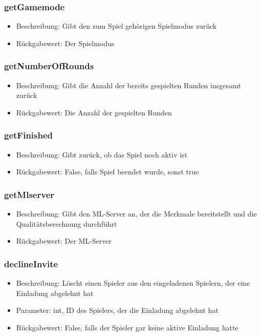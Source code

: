 \documentclass[a4paper]{scrreprt}
\begin{document}
	\subsubsection{getGamemode}
	\begin{itemize}
		\item Beschreibung: Gibt den zum Spiel gehörigen Spielmodus zurück
		\item Rückgabewert: Der Spielmodus
	\end{itemize}
	\subsubsection{getNumberOfRounds}
	\begin{itemize}
		\item Beschreibung: Gibt die Anzahl der bereits gespielten Runden insgesamt zurück
		\item Rückgabewert: Die Anzahl der gespielten Runden
	\end{itemize}     
	\subsubsection{getFinished}
	\begin{itemize}
		\item Beschreibung: Gibt zurück, ob das Spiel noch aktiv ist
		\item Rückgabewert: False, falls Spiel beendet wurde, sonst true
	\end{itemize}
	\subsubsection{getMlserver}
	\begin{itemize}
		\item Beschreibung: Gibt den ML-Server an, der die Merkmale bereitstellt und die Qualitätsberechnung durchführt
		\item Rückgabewert: Der ML-Server
	\end{itemize}
	\subsubsection{declineInvite}
	\begin{itemize}
		\item Beschreibung: Löscht einen Spieler aus den eingeladenen Spielern, der eine Einladung abgelehnt hat
		\item Parameter: int, ID des Spielers, der die Einladung abgelehnt hat
		\item Rückgabewert: False, falls der Spieler gar keine aktive Einladung hatte
	\end{itemize}
\end{document}
